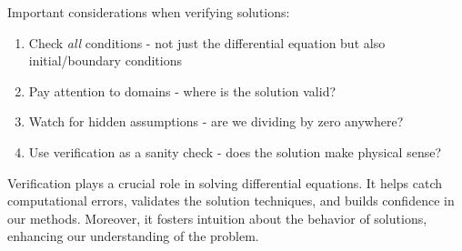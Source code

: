 \noindent Important considerations when verifying solutions:
\begin{enumerate}
   \item Check \textit{all} conditions - not just the differential equation but also initial/boundary conditions
   \item Pay attention to domains - where is the solution valid?
   \item Watch for hidden assumptions - are we dividing by zero anywhere?
   \item Use verification as a sanity check - does the solution make physical sense?
\end{enumerate}

\noindent Verification plays a crucial role in solving differential equations. It helps catch computational errors, validates the solution techniques, and builds confidence in our methods. Moreover, it fosters intuition about the behavior of solutions, enhancing our understanding of the problem. \\

